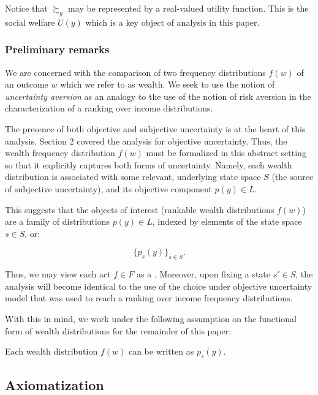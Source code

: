 \documentclass[../../../00-main.tex]{subfiles}
\begin{document}
\par Notice that $\succsim_y$ may be represented by a real-valued utility function. This is the social welfare $U(y)$ which is a key object of analysis in this paper. 

\subsubsection*{Preliminary remarks}

We are concerned with the comparison of two frequency distributions $f(w)$ of an outcome $w$ which we refer to as wealth. We seek to use the notion of \textit{uncertainty aversion} as an analogy to the use of the notion of risk aversion in the characterization of a ranking over income distributions.

The presence of both objective and subjective uncertainty is at the heart of this analysis. Section 2 covered the analysis for objective uncertainty. Thus, the wealth frequency distribution $f(w)$ must be formalized in this abstract setting so that it explicitly captures both forms of uncertainty. Namely, each wealth distribution is associated with some relevant, underlying state space $S$ (the source of subjective uncertainty), and its objective component $p(y) \in L$. 

\par This suggests that the objects of interest (rankable wealth distributions $f(w)$) are a family of distributions $p(y) \in L$, indexed by elements of the state space $s \in S$, or:

$$\{ p_s(y) \}_{s \in S}.$$

\par Thus, we may view each act $f \in F$ as a . Moreover, upon fixing a state $s' \in S$, the analysis will become identical to the use of the choice under objective uncertainty model that was used to reach a ranking over income frequency distributions.

With this in mind, we work under the following assumption on the functional form of wealth distributions for the remainder of this paper:

\begin{assu}
Each wealth distribution $f(w)$ can be written as $p_s(y)$.
\end{assu}


\subsection{Axiomatization}
\end{document}
